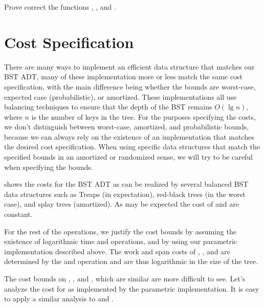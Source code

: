 \begin{chapter}
\begin{exercise}
  Prove correct the functions , , and
  .
\end{exercise}

\section{Cost Specification}
\label{sec:bst::cost}

There are many ways to implement an efficient data structure that
matches our BST ADT, many of these implementation more or less match
the same cost specification, with the main difference being whether
the bounds are worst-case, expected case (probabilistic), or
amortized.  
%
These implementations all use balancing techniques to ensure that the
depth of the BST remains $O(\lg{n})$, where $n$ is the number of keys
in the tree.  
%
For the purposes specifying the costs, we don't distinguish between
worst-case, amortized, and probabilistic bounds, because we can always
rely on the existence of an implementation that matches the desired
cost specification.  
%
When using specific data structures that match the specified bounds in
an amortized or randomized sense, we will try to be careful when
specifying the bounds.




 shows the costs for the BST ADT as can be
realized by several balanced BST data structures such as Treaps (in
expectation), red-black trees (in the worst case), and splay trees
(amortized). As may be expected the cost of  and
 are constant.
%

For the rest of the operations, we justify the cost bounds by assuming
the existence of logarithmic time  and  operations,
and by using our parametric implementation described above.
%
The work and span costs of , , and
 are determined by the  and 
operation and are thus logarithmic in the size of the tree.
%

The cost bounds on , , and
, which are similar are more difficult to see.  Let's
analyze the cost for  as implemented by the parametric
implementation. It is easy to apply a similar analysis to
 and .


\end{chapter}
